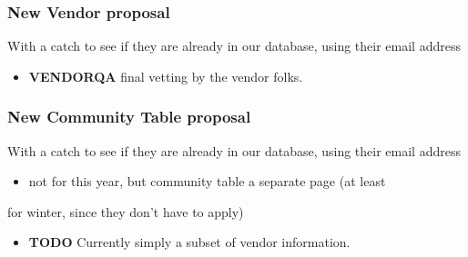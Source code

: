 \documentclass[captions=tablesignature]{scrartcl}
\begin{document}
\subsubsection{New Vendor proposal}
\label{sec-3-1-3}
With a catch to see if they are already in our database, using
their email address
\begin{itemize}
\item {\bfseries\sffamily VENDORQA} final vetting by the vendor folks.
\label{sec-3-1-3-1}
\end{itemize}

\subsubsection{New Community Table proposal}
\label{sec-3-1-4}
With a catch to see if they are already in our database, using
their email address
\begin{itemize}
\item not for this year, but community table a separate page (at least
\end{itemize}
for winter, since they don't have to apply)
\begin{itemize}
\item {\bfseries\sffamily TODO} Currently simply a subset of vendor information.
\label{sec-3-1-4-1}
\end{itemize}
\end{document}
